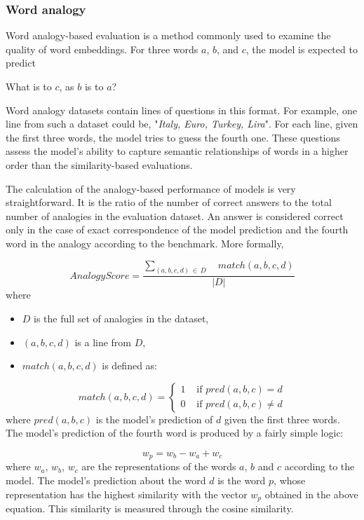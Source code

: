 \subsubsection{Word analogy}

Word analogy-based evaluation is a method commonly used to examine the quality of word embeddings. For three words $a$, $b$, and $c$, the model is expected to predict
\begin{displayquote}
\centering
What is to $c$, as $b$ is to $a$?
\end{displayquote}

Word analogy datasets contain lines of questions in this format. For example, one line from such a dataset could be, "\textit{Italy, Euro, Turkey, Lira}". For each line, given the first three words, the model tries to guess the fourth one. These questions assess the model's ability to capture semantic relationships of words in a higher order than the similarity-based evaluations.

The calculation of the analogy-based performance of models is very straightforward. It is the ratio of the number of correct answers to the total number of analogies in the evaluation dataset. An answer is considered correct only in the case of exact correspondence of the model prediction and the fourth word in the analogy according to the benchmark. More formally, 

\[
\mathit{Analogy Score} = \frac
{\sum_{(a, b, c, d)\, \in\, D}\quad \mathit{match}(a, b, c, d)}
{|D|}
\]
\noindent
where 
\begin{itemize}
    \item $D$ is the full set of analogies in the dataset,
    \item $(a, b, c, d)$ is a line from $D$,
    \item $\mathit{match}(a, b, c, d)$ is defined as:
\end{itemize}

\[
\mathit{match}(a, b, c, d) = 
\begin{cases}
1 & \text{ if } \mathit{pred}(a, b, c) = d \\ 
0 & \text{ if } \mathit{pred}(a, b, c) \neq d 
\end{cases}
\]
\noindent
where $\mathit{pred}(a, b, c)$ is the model's prediction of $d$ given the first three words. The model's prediction of the fourth word is produced by a fairly simple logic:

\[
w_p = w_b - w_a + w_c
\]
\noindent
where $w_a$, $w_b$, $w_c$ are the representations of the words $a$, $b$ and $c$ according to the model. The model's prediction about the word $d$ is the word $p$, whose representation has the highest similarity with the vector $w_p$ obtained in the above equation. This similarity is measured through the cosine similarity.

